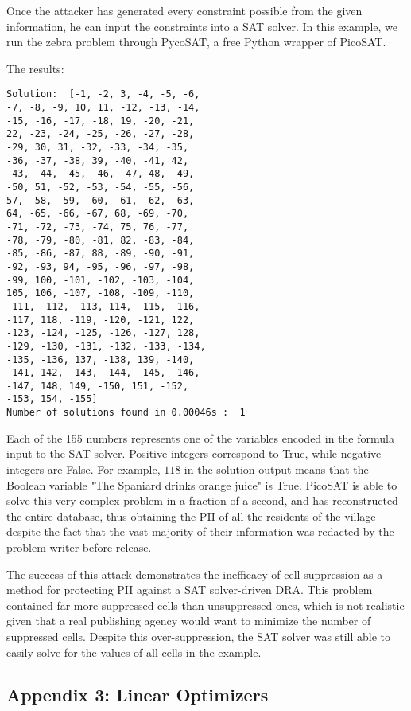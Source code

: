 \documentclass[jou,apacite]{apa6}
\begin{document}
Once the attacker has generated every constraint possible from the given information, he can input the constraints into a SAT solver. In this example, we run the zebra problem through PycoSAT, a free Python wrapper of PicoSAT.

The results:

\begin{verbatim}
Solution:  [-1, -2, 3, -4, -5, -6,
-7, -8, -9, 10, 11, -12, -13, -14,
-15, -16, -17, -18, 19, -20, -21,
22, -23, -24, -25, -26, -27, -28,
-29, 30, 31, -32, -33, -34, -35,
-36, -37, -38, 39, -40, -41, 42,
-43, -44, -45, -46, -47, 48, -49,
-50, 51, -52, -53, -54, -55, -56,
57, -58, -59, -60, -61, -62, -63,
64, -65, -66, -67, 68, -69, -70,
-71, -72, -73, -74, 75, 76, -77,
-78, -79, -80, -81, 82, -83, -84,
-85, -86, -87, 88, -89, -90, -91,
-92, -93, 94, -95, -96, -97, -98,
-99, 100, -101, -102, -103, -104,
105, 106, -107, -108, -109, -110,
-111, -112, -113, 114, -115, -116,
-117, 118, -119, -120, -121, 122,
-123, -124, -125, -126, -127, 128,
-129, -130, -131, -132, -133, -134,
-135, -136, 137, -138, 139, -140,
-141, 142, -143, -144, -145, -146,
-147, 148, 149, -150, 151, -152,
-153, 154, -155]
Number of solutions found in 0.00046s :  1
\end{verbatim}

Each of the 155 numbers represents one of the variables encoded in the formula input to the SAT solver.
Positive integers correspond to True, while negative integers are False. For example, $118$ in the solution output means that the Boolean variable "The Spaniard drinks orange juice" is True.
PicoSAT is able to solve this very complex problem in a fraction of a second, and has reconstructed the entire database, thus obtaining the PII of all the residents of the village despite the fact that the vast majority of their information was redacted by the problem writer before release.

The success of this attack demonstrates the inefficacy of
cell suppression as a method for protecting PII against
a SAT solver-driven DRA. This problem
contained far more suppressed cells than unsuppressed ones, which is not realistic given that a real publishing agency would want to minimize the number of suppressed cells. Despite this over-suppression, the SAT solver was still able to easily solve for the values of all cells in the example.

\subsection{Appendix 3: Linear Optimizers}
\end{document}
